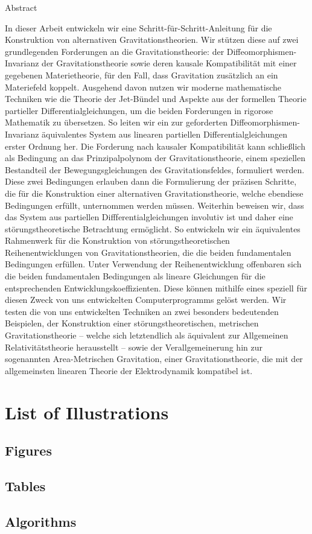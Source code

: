 \documentclass[a4paper,12pt, DIV=14, BCOR=5mm, twoside, headsepline, numbers=noenddot]{scrbook}
\makeatletter
\providecommand\phantomsection{}
\newcommand\listofillustrations{
    \chapter*{List of Illustrations}
    \phantomsection
    \section*{Figures}
    \phantomsection
    \@starttoc{lof}%
    \bigskip
    \section*{Tables}%
    \phantomsection
    \@starttoc{lot}%
    \bigskip
    \section*{Algorithms}%
    \phantomsection
    \@starttoc{loa}
    }
\newenvironment{abstract}{%
  \titlepage%
  \null\vfil%
  \begin{center}\normalfont\usekomafont{disposition}Abstract\end{center}%
}{%
  \par
  \vfil\null%
  \endtitlepage%
}
\makeatother
\begin{document}
\begin{abstract}
In dieser Arbeit entwickeln wir eine Schritt-für-Schritt-Anleitung für die Konstruktion von alternativen Gravitationstheorien. Wir stützen diese auf zwei grundlegenden Forderungen an die Gravitationstheorie: der Diffeomorphismen-Invarianz der Gravitationstheorie sowie deren kausale Kompatibilität mit einer gegebenen Materietheorie, für den Fall, dass Gravitation zusätzlich an ein Materiefeld koppelt. Ausgehend davon nutzen wir moderne mathematische Techniken wie die Theorie der Jet-Bündel und Aspekte aus der formellen Theorie partieller Differentialgleichungen, um die beiden Forderungen in rigorose Mathematik zu übersetzen. So leiten wir ein zur geforderten Diffeomorphismen-Invarianz äquivalentes System aus linearen partiellen Differentialgleichungen erster Ordnung her. Die Forderung nach kausaler Kompatibilität kann schließlich als Bedingung an das Prinzipalpolynom der Gravitationstheorie, einem speziellen Bestandteil der Bewegungsgleichungen des Gravitationsfeldes, formuliert werden. 
Diese zwei Bedingungen erlauben dann die Formulierung der präzisen Schritte, die für die Konstruktion einer alternativen Gravitationstheorie, welche ebendiese Bedingungen erfüllt, unternommen werden müssen.
Weiterhin beweisen wir, dass das System aus partiellen Diffferentialgleichungen involutiv ist und daher eine störungstheoretische Betrachtung ermöglicht. So entwickeln wir ein äquivalentes Rahmenwerk für die Konstruktion von störungstheoretischen Reihenent{\-}wicklungen von Gravitationstheorien, die die beiden fundamentalen Bedingungen erfüllen. Unter Verwendung der Reihenentwicklung offenbaren sich die beiden fundamentalen Bedingungen als lineare Gleichungen für die entsprechenden Entwicklungskoeffizienten. Diese können mithilfe eines speziell für diesen Zweck von uns entwickelten Computerprogramms gelöst werden.
Wir testen die von uns entwickelten Techniken an zwei besonders bedeutenden Beispielen, der Konstruktion einer störungstheoretischen, metrischen Gravitationstheorie -- welche sich letztendlich als äquivalent zur Allgemeinen Relativitätstheorie herausstellt -- sowie der Verallgemeinerung hin zur sogenannten Area-Metrischen Gravitation, einer Gravitationstheorie, die mit der allgemeinsten linearen Theorie der Elektrodynamik kompatibel ist.
\end{abstract}

\tableofcontents

\listofillustrations

\listoflistings
\end{document}
